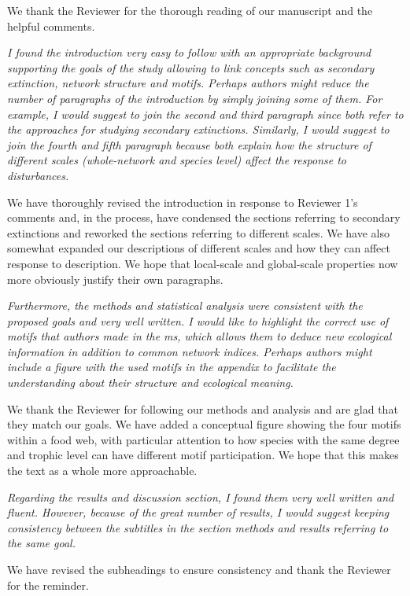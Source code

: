 \documentclass[12pt]{article}
\newcommand{\us}{\rm \setlength{\leftskip}{0.3cm} \setlength{\rightskip}{0.3cm}}
\newcommand{\them}{\it \setlength{\leftskip}{0cm} \setlength{\rightskip}{0cm}}
\begin{document}
    \us
    We thank the Reviewer for the thorough reading of our manuscript and the helpful comments. 
    
    \them
    I found the introduction very easy to follow with an appropriate background supporting the goals of the study allowing to link concepts such as secondary extinction, network structure and motifs. Perhaps authors might reduce the number of paragraphs of the introduction by simply joining some of them. For example, I would suggest to join the second and third paragraph since both refer to the approaches for studying secondary extinctions. Similarly, I would suggest to join the fourth and fifth paragraph because both explain how the structure of different scales (whole-network and species level) affect the response to disturbances.
    
    \us We have thoroughly revised the introduction in response to Reviewer 1's comments and, in the process, have condensed the sections referring to secondary extinctions and reworked the sections referring to different scales. We have also somewhat expanded our descriptions of different scales and how they can affect response to description. We hope that local-scale and global-scale properties now more obviously justify their own paragraphs.
    
    \them
    Furthermore, the methods and statistical analysis were consistent with the proposed goals and very well written. I would like to highlight the correct use of motifs that authors made in the ms, which allows them to deduce new ecological information in addition to common network indices. Perhaps authors might include a figure with the used motifs in the appendix to facilitate the understanding about their structure and ecological meaning. 
    
    \us  We thank the Reviewer for following our methods and analysis and are glad that they match our goals. We have added a conceptual figure showing the four motifs within a food web, with particular attention to how species with the same degree and trophic level can have different motif participation. We hope that this makes the text as a whole more approachable.
    
    \them
    Regarding the results and discussion section, I found them very well written and fluent. However, because of the great number of results, I would suggest keeping consistency between the subtitles in the section methods and results referring to the same goal.
    
    \us We have revised the subheadings to ensure consistency and thank the Reviewer for the reminder.
\end{document}
